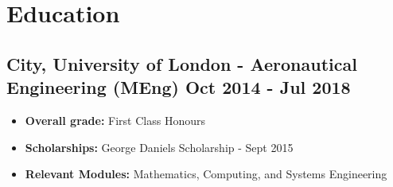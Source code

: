 \documentclass[a4paper,9pt]{article}
\begin{document}
%
%



\section*{Education}
\subsection*{\textbf {City, University of London - Aeronautical Engineering (MEng)}  \hfill Oct 2014 - Jul 2018}\FloatBarrier
\begin{itemize}[noitemsep]
	\item \textbf{Overall grade:} First Class Honours %
	\item \textbf{Scholarships:} George Daniels Scholarship - Sept 2015
\item \textbf{Relevant Modules:} Mathematics, Computing, and Systems Engineering
\end{itemize}
\end{document}
